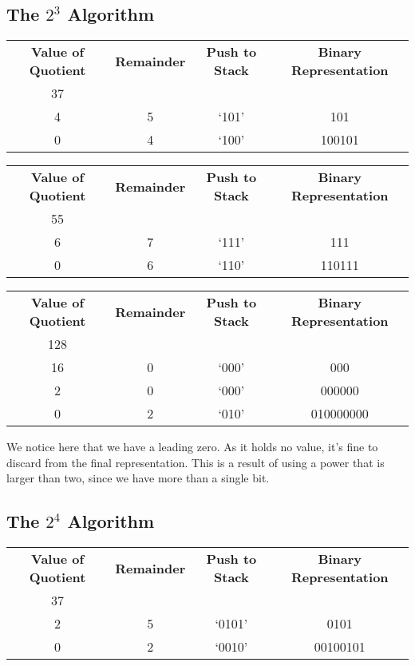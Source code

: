 \documentclass[12pt]{article}
\begin{document}
\subsection{The $2^3$ Algorithm}
\begin{center}
  \begin{tabular}{c|c|c|c}
    \textbf{Value of Quotient} & \textbf{Remainder} & \textbf{Push to Stack} & \textbf{Binary Representation} \\
    37 &   &       & \\
    4  & 5 & `101' & 101 \\
    0  & 4 & `100' & 100101
  \end{tabular}
\end{center}

\begin{center}
  \begin{tabular}{c|c|c|c}
    \textbf{Value of Quotient} & \textbf{Remainder} & \textbf{Push to Stack} & \textbf{Binary Representation} \\
    55 &   &       & \\
    6  & 7 & `111' & 111 \\
    0  & 6 & `110' & 110111
  \end{tabular}
\end{center}

\begin{center}
  \begin{tabular}{c|c|c|c}
    \textbf{Value of Quotient} & \textbf{Remainder} & \textbf{Push to Stack} & \textbf{Binary Representation} \\
    128 &   &       & \\
    16  & 0 & `000' & 000 \\
    2   & 0 & `000' & 000000 \\
    0   & 2 & `010' & 010000000
  \end{tabular}
\end{center}
We notice here that we have a leading zero. As it holds no value, it's fine to discard from the final representation. This is a result of using a power that is larger than two, since we have more than a single bit.

\subsection{The $2^4$ Algorithm}
\begin{center}
  \begin{tabular}{c|c|c|c}
    \textbf{Value of Quotient} & \textbf{Remainder} & \textbf{Push to Stack} & \textbf{Binary Representation} \\
    37 &   &        & \\
    2  & 5 & `0101' & 0101 \\
    0  & 2 & `0010' & 00100101
  \end{tabular}
\end{center}
\end{document}
